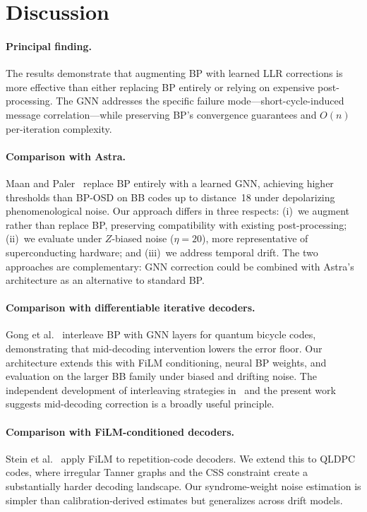 \documentclass[a4paper,twocolumn,11pt,unpublished,nopdfoutputerror]{quantumarticle}
\begin{document}
\section{Discussion}\label{sec:discussion}

\paragraph{Principal finding.}
The results demonstrate that augmenting BP with learned LLR corrections is more effective than either replacing BP entirely or relying on expensive post-processing. The GNN addresses the specific failure mode---short-cycle-induced message correlation---while preserving BP's convergence guarantees and $O(n)$ per-iteration complexity.

\paragraph{Comparison with Astra.}
Maan and Paler~\cite{Maan2025MLBP} replace BP entirely with a learned GNN, achieving higher thresholds than BP-OSD on BB codes up to distance~18 under depolarizing phenomenological noise. Our approach differs in three respects: (i)~we augment rather than replace BP, preserving compatibility with existing post-processing; (ii)~we evaluate under $Z$-biased noise ($\eta = 20$), more representative of superconducting hardware; and (iii)~we address temporal drift. The two approaches are complementary: GNN correction could be combined with Astra's architecture as an alternative to standard BP.

\paragraph{Comparison with differentiable iterative decoders.}
Gong et al.~\cite{Gong2024GNN} interleave BP with GNN layers for quantum bicycle codes, demonstrating that mid-decoding intervention lowers the error floor. Our architecture extends this with FiLM conditioning, neural BP weights, and evaluation on the larger BB family under biased and drifting noise. The independent development of interleaving strategies in~\cite{Gong2024GNN} and the present work suggests mid-decoding correction is a broadly useful principle.

\paragraph{Comparison with FiLM-conditioned decoders.}
Stein et al.~\cite{Stein2026FiLM} apply FiLM to repetition-code decoders. We extend this to QLDPC codes, where irregular Tanner graphs and the CSS constraint create a substantially harder decoding landscape. Our syndrome-weight noise estimation is simpler than calibration-derived estimates but generalizes across drift models.
\end{document}
